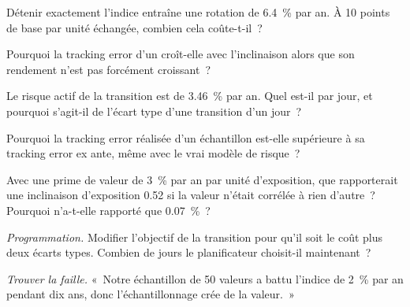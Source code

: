 \begin{exercise}[$\star$]\label{exo:s1:the-asset-managers-strategies:2}
Détenir exactement l'indice entraîne une rotation de 6.4~\% par an. À 10 points de base par unité échangée, combien cela coûte-t-il~?
\end{exercise}

\begin{exercise}[$\star$]\label{exo:s1:the-asset-managers-strategies:3}
Pourquoi la tracking error d'un  croît-elle avec l'inclinaison alors que son rendement n'est pas forcément croissant~?
\end{exercise}

\begin{exercise}[$\star\star$]\label{exo:s1:the-asset-managers-strategies:4}
Le risque actif de la transition est de 3.46~\% par an. Quel est-il par jour, et pourquoi s'agit-il de l'écart type d'une transition d'un jour~?
\end{exercise}

\begin{exercise}[$\star\star$]\label{exo:s1:the-asset-managers-strategies:5}
Pourquoi la tracking error réalisée d'un échantillon est-elle supérieure à sa tracking error ex ante, même avec le vrai modèle de risque~?
\end{exercise}

\begin{exercise}[$\star\star$]\label{exo:s1:the-asset-managers-strategies:6}
Avec une prime de valeur de 3~\% par an par unité d'exposition, que rapporterait une inclinaison d'exposition 0.52 si la valeur n'était corrélée à rien d'autre~?
Pourquoi n'a-t-elle rapporté que 0.07~\%~?
\end{exercise}

\begin{exercise}[$\star\star\star$]\label{exo:s1:the-asset-managers-strategies:7}
\emph{Programmation.} Modifier l'objectif de la transition pour qu'il soit le coût plus deux écarts types. Combien de jours le planificateur choisit-il maintenant~?
\end{exercise}

\begin{exercise}[$\star\star\star$]\label{exo:s1:the-asset-managers-strategies:8}
\emph{Trouver la faille.} «~Notre échantillon de 50 valeurs a battu l'indice de 2~\% par an pendant dix ans, donc l'échantillonnage crée de la valeur.~»
\end{exercise}

